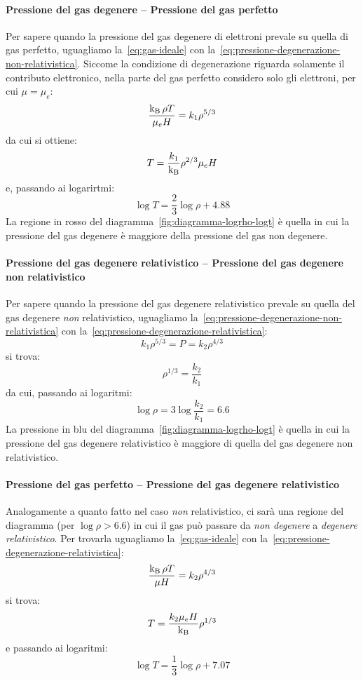 \paragraph{Pressione del gas degenere -- Pressione del gas perfetto}
Per sapere quando la pressione del gas degenere di elettroni prevale su quella di gas perfetto, uguagliamo la~\eqref{eq:gas-ideale} con la~\eqref{eq:pressione-degenerazione-non-relativistica}. Siccome la condizione di degenerazione riguarda solamente il contributo elettronico, nella parte del gas perfetto considero solo gli elettroni, per cui $\mu = \mu_e$:
\[
\frac{\operatorname{k_B} \rho T}{\mu_e H} = k_1 \rho^{5/3}
\]
da cui si ottiene:
\[
T = \frac{k_1}{\operatorname{k_B}} \rho^{2/3} \mu_e H
\]
e, passando ai logarirtmi:
\begin{equation}\label{eq:pgas-pdeg}
    \log T = \frac{2}{3} \log \rho + 4.88
\end{equation}
La regione in rosso del diagramma~\ref{fig:diagramma-logrho-logt} è quella in cui la pressione del gas degenere è maggiore della pressione del gas non degenere.

\paragraph{Pressione del gas degenere relativistico -- Pressione del gas degenere non relativistico}
Per sapere quando la pressione del gas degenere relativistico prevale su quella del gas degenere \emph{non} relativistico, uguagliamo la~\eqref{eq:pressione-degenerazione-non-relativistica} con la~\eqref{eq:pressione-degenerazione-relativistica}:
\[
k_1 \rho^{5/3} = P = k_2 \rho^{4/3}
\]
si trova:
\[
\rho^{1/3} = \frac{k_2}{k_1}
\]
da cui, passando ai logaritmi:
\begin{equation}\label{eq:pdegrel-pdegnonrel}
    \log \rho = 3 \log \frac{k_2}{k_1} = 6.6
\end{equation}
La pressione in blu del diagramma~\ref{fig:diagramma-logrho-logt} è quella in cui la pressione del gas degenere relativistico è maggiore di quella del gas degenere non relativistico.

\paragraph{Pressione del gas perfetto -- Pressione del gas degenere relativistico}
Analogamente a quanto fatto nel caso \emph{non} relativistico, ci sarà una regione del diagramma (per $\log \rho > 6.6$) in cui il gas può passare da \emph{non degenere} a \emph{degenere relativistico}. Per trovarla uguagliamo la~\eqref{eq:gas-ideale} con la~\eqref{eq:pressione-degenerazione-relativistica}:
\[
\frac{\operatorname{k_B} \rho T}{\mu H} = k_2 \rho^{4/3}
\]
si trova:
\[
T = \frac{k_2 \mu_e H}{\operatorname{k_B}} \rho^{1/3}
\]
e passando ai logaritmi:
\begin{equation}\label{eq:pgas-pdegrel}
    \log T = \frac{1}{3} \log \rho + 7.07
\end{equation}

